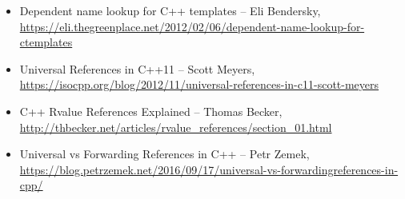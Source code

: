 \begin{itemize}
\item
Dependent name lookup for C++ templates – Eli Bendersky, \url{https://eli.thegreenplace.net/2012/02/06/dependent-name-lookup-for-ctemplates}

\item
Universal References in C++11 – Scott Meyers, \url{https://isocpp.org/blog/2012/11/universal-references-in-c11-scott-meyers}

\item
C++ Rvalue References Explained – Thomas Becker, \url{http://thbecker.net/articles/rvalue_references/section_01.html}

\item
Universal vs Forwarding References in C++ – Petr Zemek, \url{https://blog.petrzemek.net/2016/09/17/universal-vs-forwardingreferences-in-cpp/}
\end{itemize}